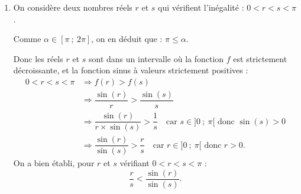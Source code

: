 \begin{enumerate}
\begin{enumerate}
\begin{center}
\end{center}

\item On en déduit que la fonction $f$ est strictement décroissante sur l'intervalle $]0~;~\alpha]$ et strictement croissante sur $[\alpha~;~2\pi]$.

\item Pour tout réel $x$ non nul, le taux d'accroissement de la fonction sinus entre 0 et $x$ est :
\[
\dfrac{\sin(x)-\sin(0)}{x-0}=\dfrac{\sin(x)-0}{x}=\dfrac{\sin(x)}{x}=f(x).
\]
Comme la fonction sinus est dérivable en 0, ce taux d'accroissement admet donc une limite finie quand $x$ tend vers 0. Par définition du nombre dérivé, cette limite est le nombre dérivé de la fonction sinus en 0.

On a donc : $\displaystyle\lim_{x\to 0}f(x)=\sin'(0)=\cos(0)=1$.

$f$ tend vers 1 quand $x$ tend vers 0.
\end{enumerate}

\item On considère deux nombres réels $r$ et $s$ qui vérifient l'inégalité : $0<r<s<\pi$.

Comme $\alpha\in[\pi~;~2\pi]$, on en déduit que : $\pi\leq \alpha$.

Donc les réels $r$ et $s$ sont dans un intervalle où la fonction $f$ est strictement décroissante, et la fonction sinus à valeurs strictement positives :
\[
\begin{aligned}
0<r<s<\pi&\Longrightarrow f(r)>f(s)\\
&\Longrightarrow \dfrac{\sin(r)}{r}>\dfrac{\sin(s)}{s}\\
&\Longrightarrow \dfrac{\sin(r)}{r\times \sin(s)}>\dfrac1s \quad \text{car } s\in ]0~;~\pi[ \text{ donc } \sin(s)>0\\
&\Longrightarrow \dfrac{\sin(r)}{\sin(s)}>\dfrac rs \quad \text{car } r\in ]0~;~\pi[ \text{ donc } r>0.
\end{aligned}
\]
On a bien établi, pour $r$ et $s$ vérifiant $0<r<s<\pi$ :
\[
\dfrac rs<\dfrac{\sin(r)}{\sin(s)}.
\]
\end{enumerate}

